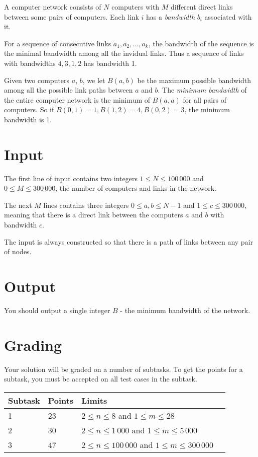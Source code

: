 A computer network consists of $N$ computers with $M$ different direct links between some pairs of computers. Each link $i$ has a \emph{bandwidth} $b_i$ associated with it.

For a sequence of consecutive links $a_1, a_2, ..., a_k$, the bandwidth of the sequence is the minimal bandwidth among all the invidual links. Thus a sequence of links with bandwidths $4, 3, 1, 2$ has bandwidth 1.

Given two computers $a$, $b$, we let $B(a, b)$ be the maximum possible bandwidth among all the possible link paths between $a$ and $b$. The \emph{minimum bandwidth} of the entire computer network is the minimum of $B(a, a)$ for all pairs of computers. So if $B(0, 1) = 1, B(1, 2) = 4, B(0, 2) = 3$, the minimum bandwidth is 1.


\section*{Input}
The first line of input contains two integers $1 \le N \le 100\,000$ and $0 \le M \le 300\,000$, the number of computers and links in the network.

The next $M$ lines contains three integers $0 \le a, b \le N - 1$ and $1 \le c \le 300\,000$, meaning that there is a direct link between the computers $a$ and $b$ with bandwidth $c$.

The input is always constructed so that there is a path of links between any pair of nodes.


\section*{Output}
You should output a single integer $B$ - the minimum bandwidth of the network.

\section*{Grading}
Your solution will be graded on a number of subtasks. To get the points for a subtask, you must
be accepted on all test cases in the subtask.

\begin{tabular}{| l | l | l | l |}
    \hline
    Subtask & Points & Limits    \\ \hline
    1     & 23         & $2 \le n \le 8$ and $1 \le m \le 28$ \\ \hline
    2     & 30         & $2 \le n \le 1\,000$ and $1 \le m \le 5\,000$ \\ \hline
    3     & 47         & $2 \le n \le 100\,000$ and $1 \le m \le 300\,000$ \\ \hline
\end{tabular}

